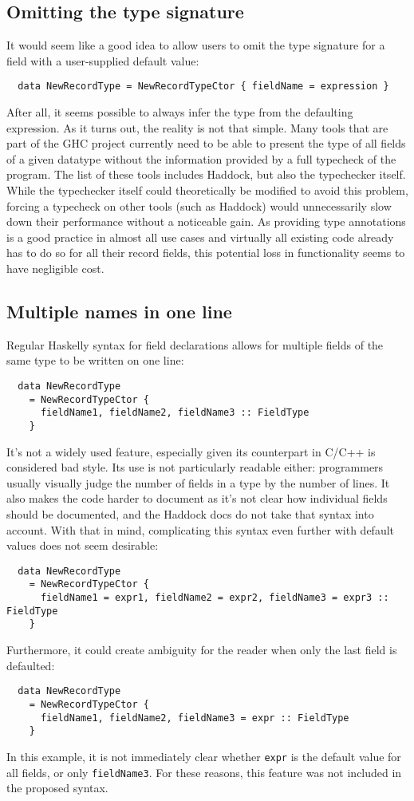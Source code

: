 \documentclass[en]{pracamgr}
\begin{document}
\subsection{Omitting the type signature}
It would seem like a good idea to allow users to omit the type signature for a field with a user-supplied default value:
\begin{lstlisting}
  data NewRecordType = NewRecordTypeCtor { fieldName = expression }
\end{lstlisting}
After all, it seems possible to always infer the type from the defaulting expression.
As it turns out, the reality is not that simple.
Many tools that are part of the GHC project currently need to be able to present the type of all fields of a given datatype without the information provided by a full typecheck of the program.
The list of these tools includes Haddock, but also the typechecker itself.
While the typechecker itself could theoretically be modified to avoid this problem, 
forcing a typecheck on other tools (such as Haddock) would unnecessarily slow down their performance without a noticeable gain.
As providing type annotations is a good practice in almost all use cases and virtually all existing code already has to do so 
for all their record fields, this potential loss in functionality seems to have negligible cost.

\subsection{Multiple names in one line}
Regular Haskelly syntax for field declarations allows for multiple fields of the same type to be written on one line:
\begin{lstlisting}
  data NewRecordType 
    = NewRecordTypeCtor { 
      fieldName1, fieldName2, fieldName3 :: FieldType 
    }
\end{lstlisting}
It's not a widely used feature, especially given its counterpart in C/C++ is considered bad style.
Its use is not particularly readable either: programmers usually visually judge the number of fields in a type by the number of lines.
It also makes the code harder to document as it's not clear how individual fields should be documented, and the Haddock docs \cite{HaddockRecordFields}
do not take that syntax into account.
With that in mind, complicating this syntax even further with default values does not seem desirable:
\begin{lstlisting}
  data NewRecordType 
    = NewRecordTypeCtor { 
      fieldName1 = expr1, fieldName2 = expr2, fieldName3 = expr3 :: FieldType 
    }
\end{lstlisting}
Furthermore, it could create ambiguity for the reader when only the last field is defaulted:
\begin{lstlisting}
  data NewRecordType 
    = NewRecordTypeCtor { 
      fieldName1, fieldName2, fieldName3 = expr :: FieldType 
    }
\end{lstlisting}
In this example, it is not immediately clear whether \texttt{expr} is the default value for all fields, or only \texttt{fieldName3}.
For these reasons, this feature was not included in the proposed syntax.
\end{document}
